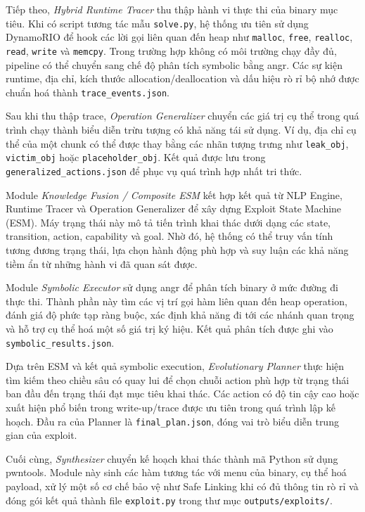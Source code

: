 \documentclass[final]{hcmuitthesis}
\begin{document}
Tiếp theo, \textit{Hybrid Runtime Tracer} thu thập hành vi thực thi của binary mục tiêu. Khi có script tương tác mẫu \texttt{solve.py}, hệ thống ưu tiên sử dụng DynamoRIO để hook các lời gọi liên quan đến heap như \texttt{malloc}, \texttt{free}, \texttt{realloc}, \texttt{read}, \texttt{write} và \texttt{memcpy}. Trong trường hợp không có môi trường chạy đầy đủ, pipeline có thể chuyển sang chế độ phân tích symbolic bằng angr. Các sự kiện runtime, địa chỉ, kích thước allocation/deallocation và dấu hiệu rò rỉ bộ nhớ được chuẩn hoá thành \texttt{trace\_events.json}.

Sau khi thu thập trace, \textit{Operation Generalizer} chuyển các giá trị cụ thể trong quá trình chạy thành biểu diễn trừu tượng có khả năng tái sử dụng. Ví dụ, địa chỉ cụ thể của một chunk có thể được thay bằng các nhãn tượng trưng như \texttt{leak\_obj}, \texttt{victim\_obj} hoặc \texttt{placeholder\_obj}. Kết quả được lưu trong \texttt{generalized\_actions.json} để phục vụ quá trình hợp nhất tri thức.

Module \textit{Knowledge Fusion / Composite ESM} kết hợp kết quả từ NLP Engine, Runtime Tracer và Operation Generalizer để xây dựng Exploit State Machine (ESM). Máy trạng thái này mô tả tiến trình khai thác dưới dạng các state, transition, action, capability và goal. Nhờ đó, hệ thống có thể truy vấn tính tương đương trạng thái, lựa chọn hành động phù hợp và suy luận các khả năng tiềm ẩn từ những hành vi đã quan sát được.

Module \textit{Symbolic Executor} sử dụng angr để phân tích binary ở mức đường đi thực thi. Thành phần này tìm các vị trí gọi hàm liên quan đến heap operation, đánh giá độ phức tạp ràng buộc, xác định khả năng đi tới các nhánh quan trọng và hỗ trợ cụ thể hoá một số giá trị ký hiệu. Kết quả phân tích được ghi vào \texttt{symbolic\_results.json}.

Dựa trên ESM và kết quả symbolic execution, \textit{Evolutionary Planner} thực hiện tìm kiếm theo chiều sâu có quay lui để chọn chuỗi action phù hợp từ trạng thái ban đầu đến trạng thái đạt mục tiêu khai thác. Các action có độ tin cậy cao hoặc xuất hiện phổ biến trong write-up/trace được ưu tiên trong quá trình lập kế hoạch. Đầu ra của Planner là \texttt{final\_plan.json}, đóng vai trò biểu diễn trung gian của exploit.

Cuối cùng, \textit{Synthesizer} chuyển kế hoạch khai thác thành mã Python sử dụng pwntools. Module này sinh các hàm tương tác với menu của binary, cụ thể hoá payload, xử lý một số cơ chế bảo vệ như Safe Linking khi có đủ thông tin rò rỉ và đóng gói kết quả thành file \texttt{exploit.py} trong thư mục \texttt{outputs/exploits/}.
\end{document}
